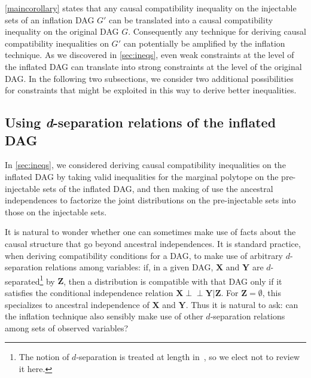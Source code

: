 \documentclass[aps,english,superscriptaddress,onecolumn,twoside,longbibliography,pra,floatfix,fleqn,nofootinbib]{revtex4-1}%
\theoremstyle{definition}
\newcommand{\indep}{\perp\!\!\!\!\perp} %
\begin{document}
\cref{maincorollary} states that any causal compatibility inequality on the injectable sets of an inflation DAG $G'$ can be translated into a causal compatibility inequality on the original DAG $G$. Consequently any technique for deriving causal compatibility inequalities on $G'$ can potentially be amplified by the inflation technique.  As we discovered in \cref{sec:ineqs}, even weak constraints at the level of the inflated DAG can translate into strong constraints at the level of the original DAG. In the following two subsections, we consider two additional possibilities for constraints that might be exploited in this way to derive better inequalities.

\subsection{Using \textit{d}-separation relations of the inflated DAG}\label{sec:fulldsep}

In \cref{sec:ineqs}, we considered deriving causal compatibility inequalities on the inflated DAG by taking valid inequalities for the marginal polytope on the pre-injectable sets of the inflated DAG, and then making of use the ancestral independences to factorize the joint distributions on the pre-injectable sets into those on the injectable sets.

It is natural to wonder whether one can sometimes make use of facts about the causal structure that go beyond ancestral independences.  It is standard practice, when deriving compatibility conditions for a DAG, to make use of arbitrary $d$-separation relations among variables: if, in a given DAG, $\bm{X}$ and $\bm{Y}$ are $d$-separated\footnote{The notion of $d$-separation is treated at length in~\cite{pearl2009causality,studeny2005probabilistic,WoodSpekkens,pusey2014gdag}, so we elect not to review it here.} by $\bm{Z}$, then a distribution is compatible with that DAG only if it satisfies the conditional independence relation $\bm{X}\indep\bm{Y}|\bm{Z}$. For $\bm{Z} = \emptyset$, this specializes to ancestral independence of $\bm{X}$ and $\bm{Y}$. Thus it is natural to ask: can the inflation technique also sensibly make use of other $d$-separation relations among sets of observed variables?

\end{document}
